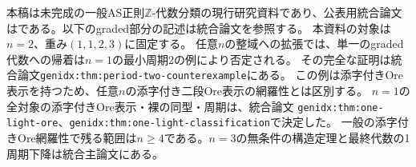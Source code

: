 \documentclass[11pt,a4paper]{ltjsarticle}
\theoremstyle{definition}
\newcommand{\ZZ}{\mathbb Z}
\begin{document}
\noindent 本稿は未完成の一般AS正則$\mathbb Z$-代数分類の現行研究資料であり、公表用統合論文はである。以下のgraded部分の記述は統合論文を参照する。
本資料の対象は$n=2$、重み$(1,1,2,3)$に固定する。
任意$n$の整域への拡張では、単一のgraded代数への帰着は$n=1$の最小周期2の例により否定される。
その完全な証明は統合論文\texttt{genidx:thm:period-two-counterexample}にある。
この例は添字付きOre表示を持つため、任意$n$の添字付き二段Ore表示の網羅性とは区別する。
$n=1$の全対象の添字付きOre表示・裸の同型・周期は、統合論文
\texttt{genidx:thm:one-light-ore}、\texttt{genidx:thm:one-light-classification}で決定した。
一般の添字付きOre網羅性で残る範囲は$n\geq4$である。$n=3$の無条件の構造定理と最終代数の1周期下降は統合主論文にある。
\begin{abstract}
最小生成元の重みが$(1,1,2,3)$で、関係が語長二次かつ重み付き斉次である
四次元AS正則$\ZZ$-代数の添字保持同型による分類を調べる。
広い対象$\mathcal Q$では、AS双対性と多項式増大から語長Koszul性、AS添字7、
語長を保つ7周期同型が従う。所期のHilbert級数を持つことと標準解消を持つことは同値である。
また整域性を仮定せず$r_2(i)=r_5(i)=1$を強制でき、
純jump 1部分は各行の次元が$n+1$となる。
有限幅の数値的分岐は、混合関係の制約と積共変ベクトルによって排除される。
混合関係数$r_3(i)=r_4(i)=2$も行列Hilbert級数の成長と890列の厳密な有限整数検査で強制でき、
全$\mathcal Q$で標準解消と標準Hilbert級数が従う。後半は計算補助の証明である。

さらに$\ZZ$-整域である対象については、標準Hilbert級数も1周期性も仮定する必要がない。
整域性による関係数の上界と七行Euler式から標準型を強制し、
重み2の正規生成元族が与える2周期性と7周期性を組み合わせて1周期性を導く。
対応するgraded代数は量子平面またはJordan平面からの2段Ore拡大であり、
左右noetherian性も結論として得られる。この構造定理の完全証明は
公表用統合論文に置く。
さらに、選んだ語長二次表示の重み2・語長1の生成元族$z_i$が全て左右正則であることは、
$A$が$\ZZ$-整域であることと同値である。7周期により、調べる生成元は七つに絞れるが、
各乗法写像の単射性は全次数で必要である。
最小周期7または非定数の関係射影階数が現れるとすれば、
少なくとも一つの$z_i$に零因子がある部分に限られる。

整域部分の二つのOre表示が裸の添字保持同型で一致するための必要十分条件は、
一つの可逆な$2\times2$行列と非零スカラーに関する有限系へ帰着した。
対角量子多項式族では、三係数トーラスの明示的な対合による商が、
全特殊値を含む裸の同型類の集合を与える。
本稿はこれらの結果の要点に加え、一般対象の七窓表示、traceの選択、
二つの基準族と同型不変量を保持する。
全対象の整域性、零因子を持つ部分の存在と分類、
一般Oreデータの軌道の標準形およびモジュライ幾何は未解決である。
構造定理と既存文献の完全な照合および新規性の最終確認も未完了である。
\end{abstract}
\tableofcontents
\end{document}

